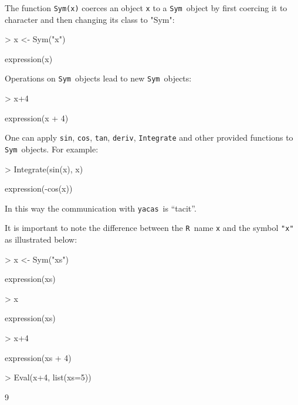 \documentclass[]{article}
\newcommand{\yacas}{{\tt yacas}}
\newcommand{\code}[1]{{\tt #1}}
\def\R{\texttt{R}}
\def\sym{\texttt{Sym}}
\begin{document}
The function \code{Sym(x)} coerces an object \code{x} to a \sym\ object by
first coercing it to character and then changing its class to "Sym":
\begin{Schunk}
\begin{Sinput}
> x <- Sym("x")
\end{Sinput}
\begin{Soutput}
expression(x)
\end{Soutput}
\end{Schunk}

Operations on \sym\ objects lead to new \sym\ objects:
\begin{Schunk}
\begin{Sinput}
> x+4
\end{Sinput}
\begin{Soutput}
expression(x + 4)
\end{Soutput}
\end{Schunk}

One can apply \code{sin}, \code{cos}, \code{tan}, \code{deriv}, \code{Integrate}
and other provided functions to \sym\ objects. For example:
\begin{Schunk}
\begin{Sinput}
> Integrate(sin(x), x)
\end{Sinput}
\begin{Soutput}
expression(-cos(x))
\end{Soutput}
\end{Schunk}
In this way the communication with \yacas\ is ``tacit''.

It is important to note the difference between the \R\ name \code{x}
and the symbol \code{"x"} as illustrated below:
\begin{Schunk}
\begin{Sinput}
> x <- Sym("xs")
\end{Sinput}
\begin{Soutput}
expression(xs)
\end{Soutput}
\begin{Sinput}
> x
\end{Sinput}
\begin{Soutput}
expression(xs)
\end{Soutput}
\begin{Sinput}
> x+4
\end{Sinput}
\begin{Soutput}
expression(xs + 4)
\end{Soutput}
\begin{Sinput}
> Eval(x+4, list(xs=5))
\end{Sinput}
\begin{Soutput}
[1] 9
\end{Soutput}
\end{Schunk}
\end{document}

